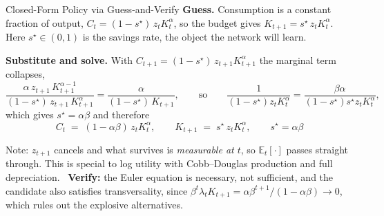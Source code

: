 \documentclass[aspectratio=169,11pt]{beamer}
\newcommand{\emphc}[1]{\textcolor{harvardcrimson}{#1}}
\newcommand{\Et}[1]{\mathbb{E}_t\!\left[#1\right]}
\begin{document}
\begin{frame}{Closed-Form Policy via Guess-and-Verify}
\textbf{Guess.} Consumption is a constant fraction of output, $C_t = (1-s^\star)\, z_t K_t^{\alpha}$, so the budget gives $K_{t+1} = s^\star\, z_t K_t^{\alpha}$. Here $s^\star \in (0,1)$ is the \emphc{savings rate}, the object the network will learn.

\textbf{Substitute and solve.} With $C_{t+1} = (1-s^\star)\, z_{t+1} K_{t+1}^{\alpha}$ the marginal term collapses,
\[
\frac{\alpha\, z_{t+1}\, K_{t+1}^{\alpha-1}}{(1-s^\star)\, z_{t+1}\, K_{t+1}^{\alpha}}
= \frac{\alpha}{(1-s^\star)\, K_{t+1}},
\qquad\text{so}\qquad
\frac{1}{(1-s^\star) z_t K_t^{\alpha}} = \frac{\beta\alpha}{(1-s^\star) s^\star z_t K_t^{\alpha}} ,
\]
which gives $s^\star = \alpha\beta$ and therefore
\[
\boxed{\;\; C_t \;=\; (1-\alpha\beta)\, z_t K_t^{\alpha},
\qquad K_{t+1} \;=\; s^\star\, z_t K_t^{\alpha}, \qquad s^\star = \alpha\beta \;\;}
\]

{\footnotesize \emphc{Note:} $z_{t+1}$ cancels and what survives is \emph{measurable at $t$}, so $\Et{\cdot}$ passes straight through. This is special to log utility with Cobb--Douglas production and full depreciation. \ \textbf{Verify:} the Euler equation is necessary, not sufficient, and the candidate also satisfies transversality, since $\beta^t \lambda_t K_{t+1} = \alpha\beta^{t+1}/(1-\alpha\beta) \to 0$, which rules out the explosive alternatives.}
\end{frame}
\end{document}
